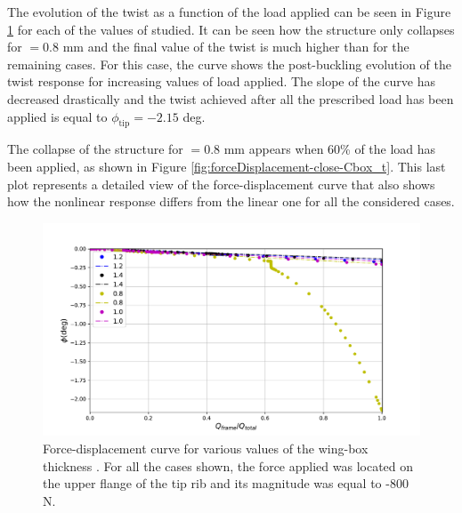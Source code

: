     The evolution of the twist as a function of the load applied can be seen in Figure \ref{fig:forceDisplacement-far-Cbox_t} for each of the values of \boxt studied. It can be seen how the structure only collapses for \boxt$= 0.8$ mm and the final value of the twist is much higher than for the remaining cases. For this case, the curve shows the post-buckling evolution of the twist response for increasing values of load applied. The slope of the curve has decreased drastically and the twist achieved after all the prescribed load has been applied is equal to $\phi_{\mathrm{tip}} = -2.15$ deg.

    The collapse of the structure for \boxt$= 0.8$ mm appears when 60\% of the load has been applied, as shown in Figure \ref{fig:forceDisplacement-close-Cbox_t}. This last plot represents a detailed view of the force-displacement curve that also shows how the nonlinear response differs from the linear one for all the considered cases.

    \begin{figure}[!htpb] %
      \centering
      \includegraphics[width=0.8 \textwidth]{../figures/result-sim/cbox/force_displacement-far}
      \caption[Force-displacement curve for various values of the wing-box thickness]{Force-displacement curve for various values of the wing-box thickness \boxt. For all the cases shown, the force applied was located on the upper flange of the tip rib and its magnitude was equal to -800 N.}\label{fig:forceDisplacement-far-Cbox_t}
    \end{figure}

